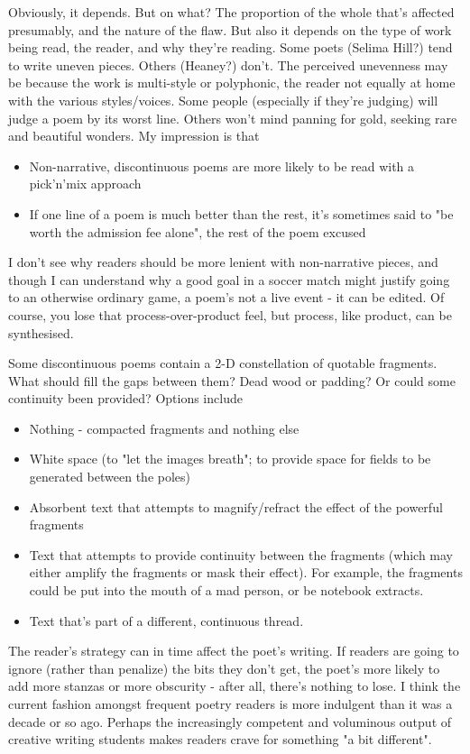 \documentclass[11pt]{article}
\begin{document}
Obviously, it depends. But on what? The proportion of the whole that's affected presumably, and the nature of the flaw. But also it depends on the type of work being read, the reader, and why they're reading. Some poets (Selima Hill?) tend to write uneven pieces. Others (Heaney?) don't. The perceived unevenness may be because the work is multi-style or polyphonic, the reader not equally at home with the various styles/voices. Some people (especially if they're judging) will judge a poem by its worst line. Others won't mind panning for gold, seeking rare and beautiful wonders. My impression is that
\begin{itemize}

\item Non-narrative, discontinuous poems are more likely to be read with a pick'n'mix approach
\item If one line of a poem is much better than the rest, it's sometimes said to "be worth the admission fee alone", the rest of the poem excused
\end{itemize}

I don't see why readers should be more lenient with non-narrative pieces, and though I can understand why a good goal in a soccer match might justify going to an otherwise ordinary game, a poem's not a live event - it can be edited. Of course, you lose that process-over-product feel, but process, like product,  can be synthesised.

Some discontinuous poems contain a 2-D constellation of quotable fragments. What should fill the gaps between them? Dead wood or padding? Or could some continuity been provided? Options include
\begin{itemize}
\item Nothing - compacted fragments and nothing else
\item White space (to "let the images breath"; to provide space for fields to be generated between the poles)
\item Absorbent text that attempts to magnify/refract the effect of the powerful fragments
\item Text that attempts to provide continuity between the fragments (which may either amplify the fragments or mask their effect). For example, the fragments could be put into the mouth of a mad person, or be notebook extracts.
\item Text that's part of a different, continuous thread.
\end{itemize}
The reader's strategy can in time affect the poet's writing. If readers are going to ignore (rather than penalize) the bits they don't get, the poet's more likely to add more stanzas or more obscurity - after all, there's nothing to lose. I think the current fashion amongst frequent poetry readers is more indulgent than it was a decade or so ago. Perhaps the increasingly competent and voluminous output of creative writing students makes readers crave for something "a bit different".
\end{document}
